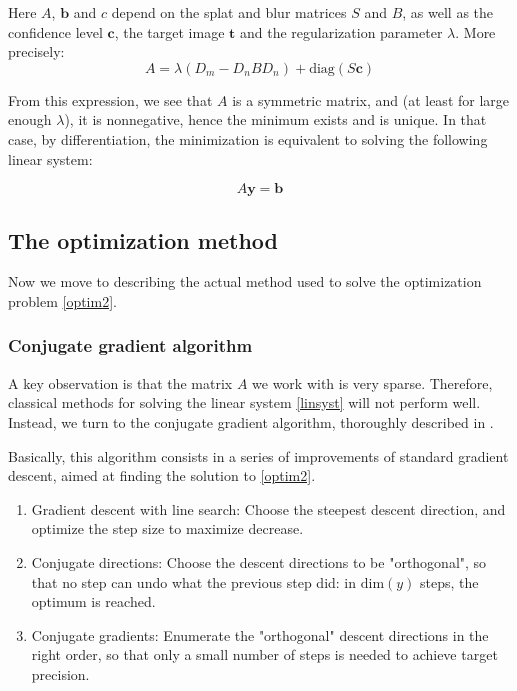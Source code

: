 \documentclass{article}
\begin{document}
Here $A$, $\textbf{b}$ and $c$ depend on the splat and blur matrices $S$ and $B$, as well as the confidence level $\textbf{c}$, the target image $\textbf{t}$ and the regularization parameter $\lambda$. More precisely:
\begin{equation}
    A = \lambda (D_m - D_n B D_n) + \mathrm{diag}(S\textbf{c})
\end{equation}

From this expression, we see that $A$ is a symmetric matrix, and (at least for large enough $\lambda$), it is nonnegative, hence the minimum exists and is unique.
In that case, by differentiation, the minimization is equivalent to solving the following linear system:

\begin{equation} \label{linsyst}
    A \textbf{y} = \textbf{b}
\end{equation}

\subsection{The optimization method}

Now we move to describing the actual method used to solve the optimization problem \eqref{optim2}.

\subsubsection{Conjugate gradient algorithm}

A key observation is that the matrix $A$ we work with is very sparse. Therefore, classical methods for solving the linear system \eqref{linsyst} will not perform well. Instead, we turn to the conjugate gradient algorithm, thoroughly described in \cite{shewchuk_introduction_1994}.

\medskip

Basically, this algorithm consists in a series of improvements of standard gradient descent, aimed at finding the solution to \eqref{optim2}.

\begin{enumerate}
    \item Gradient descent with line search: Choose the steepest descent direction, and optimize the step size to maximize decrease.
    \item Conjugate directions: Choose the descent directions to be "orthogonal", so that no step can undo what the previous step did: in $\text{dim}(y)$ steps, the optimum is reached.
    \item Conjugate gradients: Enumerate the "orthogonal" descent directions in the right order, so that only a small number of steps is needed to achieve target precision.
\end{enumerate}
\end{document}
